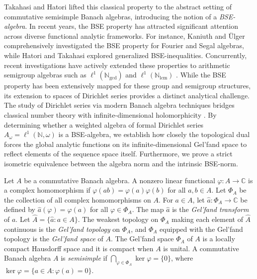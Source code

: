 \documentclass{amsart}
\theoremstyle{definition}
\theoremstyle{remark}
\numberwithin{equation}{section}
\begin{document}
Takahasi and Hatori \cite{takahasi1990} lifted this classical property to the abstract setting of commutative semisimple Banach algebras, introducing the notion of a \emph{BSE-algebra}. In recent years, the BSE property has attracted significant attention across diverse functional analytic frameworks. For instance, Kaniuth and \"Ulger \cite{kaniuth2010} comprehensively investigated the BSE property for Fourier and Segal algebras, while Hatori and Takahasi \cite{hatori2001} explored generalized BSE-inequalities. Concurrently, recent investigations have actively extended these properties to arithmetic semigroup algebras such as $\ell^1(\mathbb N_{\gcd})$ and $\ell^1(\mathbb N_{\text{lcm}})$ \cite{dabhi2026}. While the BSE property has been extensively mapped for these group and semigroup structures, its extension to spaces of Dirichlet series provides a distinct analytical challenge. The study of Dirichlet series via modern Banach algebra techniques bridges classical number theory with infinite-dimensional holomorphicity \cite{bayart, helson}. By determining whether a weighted algebra of formal Dirichlet series $A_\omega = \ell^1(\mathbb N, \omega)$ is a BSE-algebra, we establish how closely the topological dual forces the global analytic functions on its infinite-dimensional Gel'fand space to reflect elements of the sequence space itself. Furthermore, we prove a strict isometric equivalence between the algebra norm and the intrinsic BSE-norm.

Let $A$ be a commutative Banach algebra. A nonzero linear functional $\varphi:A \to \mathbb C$ is a complex homomorphism if $\varphi(ab)=\varphi(a)\varphi(b)$ for all $a, b \in A$. Let $\Phi_A$ be the collection of all complex homomorphisms on $A$. For $a \in A$, let $\widehat a:\Phi_A \to \mathbb C$ be defined by $\widehat a(\varphi)=\varphi(a)$ for all $\varphi \in \Phi_A$. The map $\widehat a$ is the \emph{Gel'fand transform} of $a$. Let $\widehat A=\{\widehat a:a\in A\}$. The weakest topology on $\Phi_A$ making each element of $\widehat A$ continuous is the \emph{Gel'fand topology} on $\Phi_A$, and $\Phi_A$ equipped with the Gel'fand topology is the \emph{Gel'fand space} of $A$. The Gel'fand space $\Phi_A$ of $A$ is a locally compact Hausdorff space and it is compact when $A$ is unital. A commutative Banach algebra $A$ is \emph{semisimple} if $\bigcap_{\varphi \in \Phi_A} \ker\varphi=\{0\}$, where $\ker\varphi=\{a \in A:\varphi(a)=0\}$.
\end{document}
